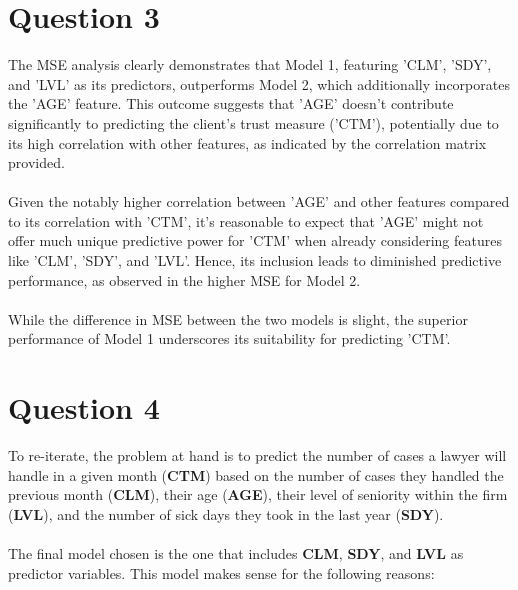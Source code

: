 \documentclass{article}
\begin{document}
\section*{Question 3}
The MSE analysis clearly demonstrates that Model 1, featuring 'CLM', 'SDY', and 'LVL' as its predictors, outperforms Model 2, which additionally incorporates the 'AGE' feature. This outcome suggests that 'AGE' doesn't contribute significantly to predicting the client's trust measure ('CTM'), potentially due to its high correlation with other features, as indicated by the correlation matrix provided.
\\\\
Given the notably higher correlation between 'AGE' and other features compared to its correlation with 'CTM', it's reasonable to expect that 'AGE' might not offer much unique predictive power for 'CTM' when already considering features like 'CLM', 'SDY', and 'LVL'. Hence, its inclusion leads to diminished predictive performance, as observed in the higher MSE for Model 2.
\\\\
While the difference in MSE between the two models is slight, the superior performance of Model 1 underscores its suitability for predicting 'CTM'.

\section*{Question 4}
To re-iterate, the problem at hand is to predict the number of cases a lawyer will handle in a given month (\textbf{CTM}) based on the number of cases they handled the previous month (\textbf{CLM}), their age (\textbf{AGE}), their level of seniority within the firm (\textbf{LVL}), and the number of sick days they took in the last year (\textbf{SDY}).
\\\\
\noindent The final model chosen is the one that includes \textbf{CLM}, \textbf{SDY}, and \textbf{LVL} as predictor variables. This model makes sense for the following reasons:
\end{document}
